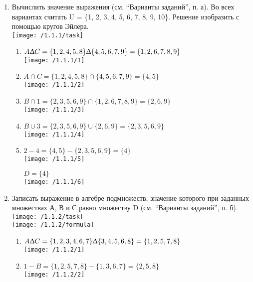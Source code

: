 \documentclass[a4paper,14pt]{extarticle}
\begin{document}
	\begin{enumerate}[№1. ]
		\item Вычислить значение выражения (см. “Варианты заданий”, п. а). Во всех вариантах считать U = \{1, 2, 3, 4, 5, 6, 7, 8, 9, 10\}. Решение изобразить с помощью кругов Эйлера.\\
		\texttt{[image: /1.1.1/task]}
		\begin{enumerate}[1.]
			\item $A \Updelta C=\{1,2,4,5,8\}\Updelta\{4,5,6,7,9\}=\{1,2,6,7,8,9\}$\\
			\texttt{[image: /1.1.1/1]}
			
			\item $A \cap C=\{1,2,4,5,8\}\cap\{4,5,6,7,9\}=\{4,5\}$\\
			\texttt{[image: /1.1.1/2]}
			
			\item $B \cap 1=\{2,3,5,6,9\}\cap\{1,2,6,7,8,9\}=\{2,6,9\}$\\
			\texttt{[image: /1.1.1/3]}
			
			\item $B \cup 3=\{2,3,5,6,9\}\cup\{2,6,9\}=\{2,3,5,6,9\}$\\
			\texttt{[image: /1.1.1/4]}
			
			\item $2 - 4=\{4,5\} - \{2,3,5,6,9\}=\{4\}$\\
			\texttt{[image: /1.1.1/5]}
			
			$D=\{4\}$\\
			\texttt{[image: /1.1.1/6]}
		\end{enumerate}
		\item Записать выражение в алгебре подмножеств, значение которого при заданных множествах А, В и С равно множеству D (см. “Варианты заданий”, п. б).\\
		\texttt{[image: /1.1.2/task]}\\
		\texttt{[image: /1.1.2/formula]}\\
		\begin{enumerate}[1.]
			\item $A \Updelta C=\{1,2,3,4,6,7\}\Updelta\{3,4,5,6,8\}=\{1,2,5,7,8\}$\\
			\texttt{[image: /1.1.2/1]}
			
			\item $1 - B=\{1,2,5,7,8\} - \{1,3,6,7\}=\{2,5,8\}$\\
			\texttt{[image: /1.1.2/2]}
			

\end{enumerate}
\end{enumerate}
\end{document}
